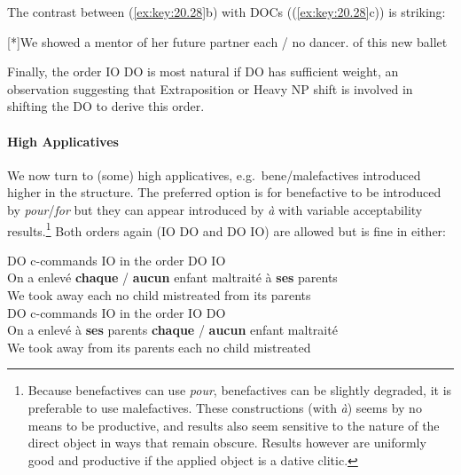 \documentclass[output=paper]{langsci/langscibook}
\begin{document}
The contrast between  (\ref{ex:key:20.28}b) with 
\glspl{DOC} ((\ref{ex:key:20.28}c)) is striking:

\begin{exe}
    \exi{\eqref{ex:key:20.28}}
    \begin{xlist}
    [*]{We {} showed  a mentor of her future partner each / no dancer.\glossF{} of this new ballet}
    \end{xlist}
\end{exe}

Finally, the order IO DO is most natural if DO has sufficient weight, an
observation suggesting that Extraposition or Heavy NP shift is involved in
shifting the DO to derive this order.

\paragraph*{High Applicatives} We now turn to (some) high applicatives, e.g.\
bene/male\-factives introduced higher in the structure. The preferred option is
for benefactive to be introduced by \emph{pour}/\emph{for} but they can appear
introduced by \emph{à} with variable acceptability results.\footnote{Because
    benefactives can use {\it pour}, benefactives can be slightly degraded, it
    is preferable to use malefactives. These constructions (with \emph{à})
    seems by no means to be productive, and results also seem sensitive to the
nature of the direct object in ways that remain obscure. Results however are
uniformly good and productive if the applied object is a dative clitic.} Both
orders again (IO DO and DO IO) are allowed but \isi{binding} is fine in either:

\ea \label{doio25}
\ea  DO c-commands IO in the order DO IO\\
\gll On a  enlev\'{e} \textbf{chaque} / \textbf{aucun} enfant maltrait\'e \`{a} {\bf ses} parents\\
We {} {took away} each {} no child mistreated from its parents\\
\ex  DO c-commands IO in the order IO DO\\
\gll On a  enlev\'{e} \`{a} {\bf ses} parents \textbf{chaque} / \textbf{aucun} enfant maltrait\'e \\
We {} {took away}  from its parents each {} no child mistreated\\
\z
\z
\end{document}
